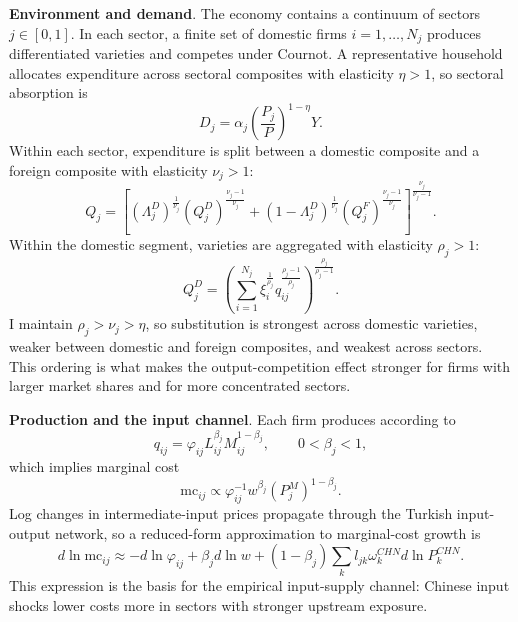 \documentclass[12pt]{article}
\begin{document}
\textbf{Environment and demand}. The economy contains a continuum of sectors $j \in [0,1]$. In each sector, a finite set of domestic firms $i = 1,\ldots,N_j$ produces differentiated varieties and competes under Cournot. A representative household allocates expenditure across sectoral composites with elasticity $\eta > 1$, so sectoral absorption is
\[
D_j = \alpha_j \left(\frac{P_j}{P}\right)^{1-\eta} Y.
\]
Within each sector, expenditure is split between a domestic composite and a foreign composite with elasticity $\nu_j > 1$:
\[
Q_j = \left[(\Lambda_j^D)^{\frac{1}{\nu_j}} (Q_j^D)^{\frac{\nu_j-1}{\nu_j}} + (1-\Lambda_j^D)^{\frac{1}{\nu_j}} (Q_j^F)^{\frac{\nu_j-1}{\nu_j}}\right]^{\frac{\nu_j}{\nu_j-1}}.
\]
Within the domestic segment, varieties are aggregated with elasticity $\rho_j > 1$:
\[
Q_j^D = \left(\sum_{i=1}^{N_j} \xi_i^{\frac{1}{\rho_j}} q_{ij}^{\frac{\rho_j-1}{\rho_j}} \right)^{\frac{\rho_j}{\rho_j-1}}.
\]
I maintain $\rho_j > \nu_j > \eta$, so substitution is strongest across domestic varieties, weaker between domestic and foreign composites, and weakest across sectors. This ordering is what makes the output-competition effect stronger for firms with larger market shares and for more concentrated sectors.

\textbf{Production and the input channel}. Each firm produces according to
\[
q_{ij} = \varphi_{ij} L_{ij}^{\beta_j} M_{ij}^{1-\beta_j},
\qquad 0<\beta_j<1,
\]
which implies marginal cost
\[
\text{mc}_{ij} \propto \varphi_{ij}^{-1} w^{\beta_j} (P_j^M)^{1-\beta_j}.
\]
Log changes in intermediate-input prices propagate through the Turkish input-output network, so a reduced-form approximation to marginal-cost growth is
\begin{equation}
d \ln \text{mc}_{ij} \approx -d \ln \varphi_{ij} + \beta_j d \ln w + (1-\beta_j) \sum_k l_{jk} \omega_k^{CHN} d \ln P_k^{CHN}.
\label{eq:marginal_cost_io}
\end{equation}
This expression is the basis for the empirical input-supply channel: Chinese input shocks lower costs more in sectors with stronger upstream exposure.
\end{document}
